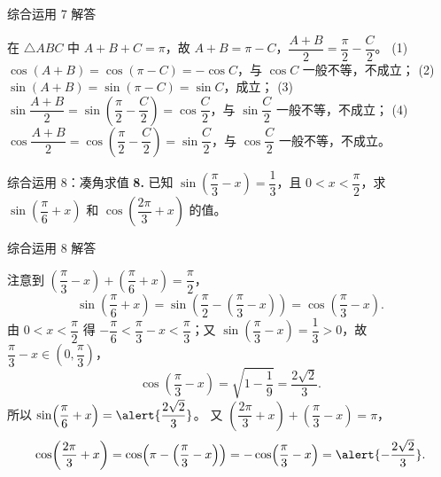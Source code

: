 \documentclass[10pt,aspectratio=169,serif]{beamer}
\begin{document}
\begin{frame}[t]{综合运用 7 解答}
\begin{tcolorbox}[colback=orange!10,colframe=orange,title=\textbf{解}]
在 $\triangle ABC$ 中 $A+B+C=\pi$，故 $A+B=\pi-C$，$\dfrac{A+B}{2}=\dfrac{\pi}{2}-\dfrac{C}{2}$。
\vspace{0.3em}
(1) $\cos(A+B)=\cos(\pi-C)=-\cos C$，与 $\cos C$ 一般不等，\alert{不成立}；
\vspace{0.3em}
(2) $\sin(A+B)=\sin(\pi-C)=\sin C$，\alert{成立}；
\vspace{0.3em}
(3) $\sin\dfrac{A+B}{2}=\sin\!\left(\dfrac{\pi}{2}-\dfrac{C}{2}\right)=\cos\dfrac{C}{2}$，与 $\sin\dfrac{C}{2}$ 一般不等，\alert{不成立}；
\vspace{0.3em}
(4) $\cos\dfrac{A+B}{2}=\cos\!\left(\dfrac{\pi}{2}-\dfrac{C}{2}\right)=\sin\dfrac{C}{2}$，与 $\cos\dfrac{C}{2}$ 一般不等，\alert{不成立}。
\end{tcolorbox}
\end{frame}

\begin{frame}[t]{综合运用 8：凑角求值}
\textbf{8.} 已知 $\sin\!\left(\dfrac{\pi}{3}-x\right)=\dfrac13$，且 $0<x<\dfrac{\pi}{2}$，求 $\sin\!\left(\dfrac{\pi}{6}+x\right)$ 和 $\cos\!\left(\dfrac{2\pi}{3}+x\right)$ 的值。
\end{frame}

\begin{frame}[t]{综合运用 8 解答}
\begin{tcolorbox}[colback=orange!10,colframe=orange,title=\textbf{解}]
注意到 $\left(\dfrac{\pi}{3}-x\right)+\left(\dfrac{\pi}{6}+x\right)=\dfrac{\pi}{2}$，
\[
\sin\!\left(\frac{\pi}{6}+x\right)
=\sin\!\left(\frac{\pi}{2}-\left(\frac{\pi}{3}-x\right)\right)
=\cos\!\left(\frac{\pi}{3}-x\right).
\]
由 $0<x<\dfrac{\pi}{2}$ 得 $-\dfrac{\pi}{6}<\dfrac{\pi}{3}-x<\dfrac{\pi}{3}$；又 $\sin\!\left(\dfrac{\pi}{3}-x\right)=\dfrac13>0$，故 $\dfrac{\pi}{3}-x\in\left(0,\dfrac{\pi}{3}\right)$，
\[
\cos\!\left(\frac{\pi}{3}-x\right)=\sqrt{1-\frac19}=\frac{2\sqrt2}{3}.
\]
所以 $\sin\!\left(\dfrac{\pi}{6}+x\right)=\alert{\dfrac{2\sqrt2}{3}}$。
\vspace{0.3em}
又 $\left(\dfrac{2\pi}{3}+x\right)+\left(\dfrac{\pi}{3}-x\right)=\pi$，
\[
\cos\!\left(\frac{2\pi}{3}+x\right)=\cos\!\left(\pi-\left(\frac{\pi}{3}-x\right)\right)=-\cos\!\left(\frac{\pi}{3}-x\right)=\alert{-\frac{2\sqrt2}{3}}.
\]
\end{tcolorbox}
\end{frame}
\end{document}
